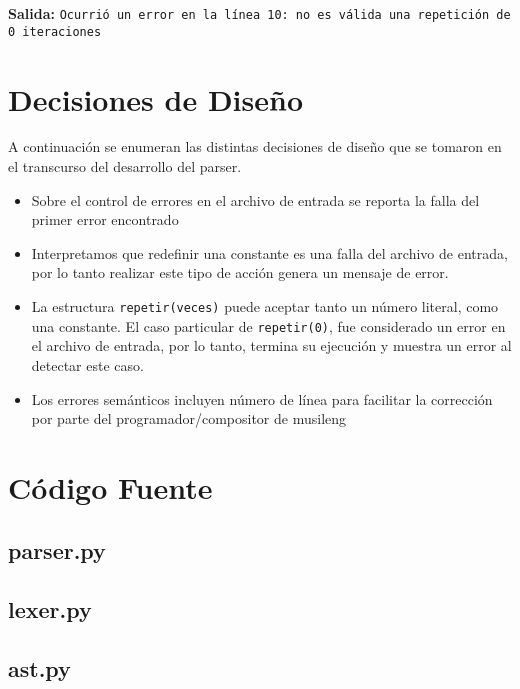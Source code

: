 \documentclass[a4paper,8pt]{article}
\begin{document}
\textbf{Salida:} \texttt{Ocurrió un error en la línea 10: no es válida una repetición de 0 iteraciones}

\section{Decisiones de Diseño}
A continuación se enumeran las distintas decisiones de diseño que se tomaron en el transcurso del desarrollo del parser.
\begin{itemize}
\item Sobre el control de errores en el archivo de entrada se reporta la falla del primer error encontrado
\item Interpretamos que redefinir una constante es una falla del archivo de entrada, por lo tanto realizar este tipo de acción genera un mensaje de error.
\item La estructura \texttt{repetir(veces){}} puede aceptar tanto un número literal, como una constante. El caso particular de \texttt{repetir(0)}, fue considerado un error en el archivo de entrada, por lo tanto, termina su ejecución y muestra un error al detectar este caso.
\item Los errores semánticos incluyen número de línea para facilitar la corrección por parte del programador/compositor de musileng
\end{itemize}

\newpage
\section{Código Fuente}

\subsection{parser.py}
\begin{small}
  
\end{small}
\newpage
\subsection{lexer.py}
\begin{small}
  
\end{small}
\newpage
\subsection{ast.py}
\begin{small}
  
\end{small}
\newpage
\end{document}
